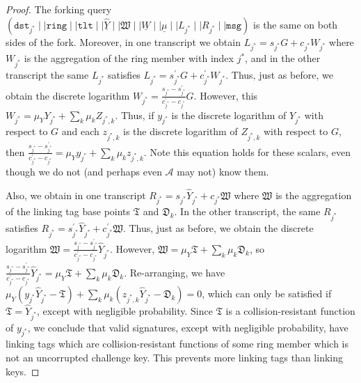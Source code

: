 \documentclass[11pt]{article}
\theoremstyle{definition}
\newcommand{\tlt}{\texttt{tlt}}
\newcommand{\ring}{\texttt{ring}}
\newcommand{\msg}{\texttt{msg}}
\newcommand{\signaturequerystar}{(\texttt{dst}_{j^*} \mid \mid \ring \mid \mid \tlt \mid \mid \underline{\widehat{Y}} \mid \mid \mathfrak{W} \mid \mid \underline{W} \mid \mid \underline{\mu} \mid \mid L_{j^*} \mid \mid R_{j^*} \mid \mid \msg)}
\begin{document}
\begin{proof}
The forking query  $\signaturequerystar$ is the same on both sides of the fork. Moreover, in one transcript we obtain $L_{j^*} = s_{j^*} G + c_{j^*} W_{j^*}$ where $W_{j^*}$ is the aggregation of the ring member with index $j^*$, and in the other transcript the same $L_{j^*}$ satisfies $L_{j^*} = s_{j^*}^\prime G + c_{j^*}^\prime W_{j^*}$. Thus, just as before, we obtain the discrete logarithm $W_{j^*} = \frac{s_{j^*} - s_{j^*}^\prime}{c_{j^*}^\prime - c_{j^*}}G$. However, this $W_{j^*} = \mu_Y Y_{j^*} + \sum_k \mu_k Z_{j^*,k}$. Thus, if $y_{j^*}$ is the discrete logarithm of $Y_{j^*}$ with respect to $G$ and each $z_{j^*,k}$ is the discrete logarithm of $Z_{j^*,k}$ with respect to $G$, then $\frac{s_{j^*} - s_{j^*}^\prime}{c_{j^*}^\prime - c_{j^*}} = \mu_Y y_{j^*} + \sum_k \mu_k z_{j^*,k}$. Note this equation holds for these scalars, even though we do not (and perhaps even $\mathcal{A}$ may not) know them.

Also, we obtain in one transcript $R_{j^*} = s_{j^*} \widehat{Y}_{j^*} + c_{j^*} \mathfrak{W}$ where $\mathfrak{W}$ is the aggregation of the linking tag base points $\mathfrak{T}$ and $\mathfrak{D}_k$. In the other transcript, the same $R_{j^*}$ satisfies $R_{j^*} = s_{j^*}^\prime \widehat{Y}_{j^*} + c_{j^*}^\prime \mathfrak{W}$. Thus, just as before, we obtain the discrete logarithm $\mathfrak{W} = \frac{s_{j^*} - s_{j^*}^\prime}{c_{j^*}^\prime - c_{j^*}}\widehat{Y}_{j^*}$. However, $\mathfrak{W} = \mu_Y \mathfrak{T} + \sum_k \mu_k \mathfrak{D}_k$, so $\frac{s_{j^*} - s_{j^*}^\prime}{c_{j^*}^\prime - c_{j^*}}\widehat{Y}_{j^*} = \mu_Y \mathfrak{T} + \sum_k \mu_k \mathfrak{D}_k$.
Re-arranging, we have $\mu_Y\left(y_{j^*} \widehat{Y}_{j^*} - \mathfrak{T}\right) + \sum_k \mu_k\left(z_{j^*,k} \widehat{Y}_{j^*} - \mathfrak{D}_k\right) = 0$, which can only be satisfied if $\mathfrak{T} = \widehat{Y}_{j^*}$, except with negligible probability. 
Since $\mathfrak{T}$ is a collision-resistant function of $y_{j^*}$, we conclude that valid signatures, except with negligible probability, have linking tags which are collision-resistant functions of some ring member which is not an uncorrupted challenge key. This prevents more linking tags than linking keys.
\end{proof}




% 





% 































\end{document}

